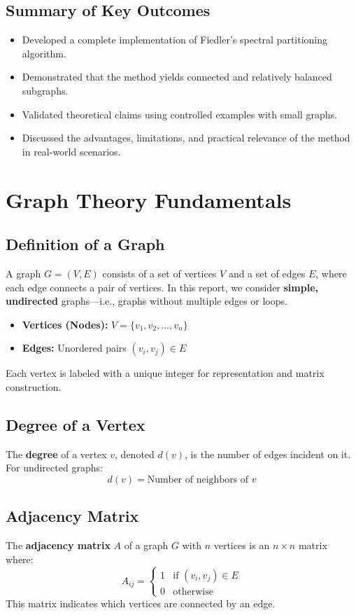 \documentclass[hidelinks,12pt]{article}
\begin{document}
\subsection*{Summary of Key Outcomes}
\begin{itemize}
    \item Developed a complete implementation of Fiedler’s spectral partitioning algorithm.
    \item Demonstrated that the method yields connected and relatively balanced subgraphs.
    \item Validated theoretical claims using controlled examples with small graphs.
    \item Discussed the advantages, limitations, and practical relevance of the method in real-world scenarios.
\end{itemize}
\newpage
\section{Graph Theory Fundamentals}

\subsection{Definition of a Graph}
A graph \( G = (V, E) \) consists of a set of vertices \( V \) and a set of edges \( E \), where each edge connects a pair of vertices. In this report, we consider \textbf{simple, undirected} graphs—i.e., graphs without multiple edges or loops.

\begin{itemize}
    \item \textbf{Vertices (Nodes):} \( V = \{v_1, v_2, \dots, v_n\} \)
    \item \textbf{Edges:} Unordered pairs \( (v_i, v_j) \in E \)
\end{itemize}

\noindent Each vertex is labeled with a unique integer for representation and matrix construction.

\subsection*{Degree of a Vertex}
The \textbf{degree} of a vertex \( v \), denoted \( d(v) \), is the number of edges incident on it. For undirected graphs:
\[
d(v) = \text{Number of neighbors of } v
\]

\subsection*{Adjacency Matrix}
The \textbf{adjacency matrix} \( A \) of a graph \( G \) with \( n \) vertices is an \( n \times n \) matrix where:
\[
A_{ij} = 
\begin{cases}
1 & \text{if } (v_i, v_j) \in E \\
0 & \text{otherwise}
\end{cases}
\]
This matrix indicates which vertices are connected by an edge.
\end{document}
